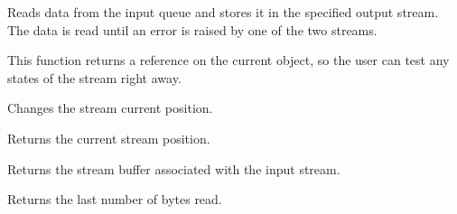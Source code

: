 
Reads data from the input queue and stores it in the specified output stream.
The data is read until an error is raised by one of the two streams.


This function returns a reference on the current object, so the user can test
any states of the stream right away.



Changes the stream current position.



Returns the current stream position.



Returns the stream buffer associated with the input stream.



Returns the last number of bytes read.

